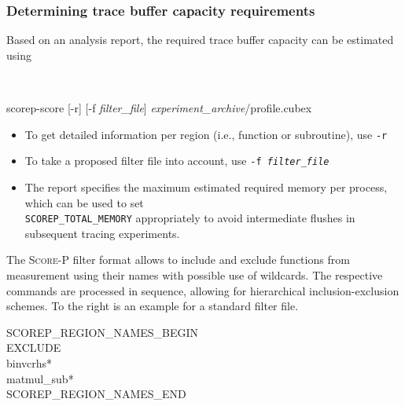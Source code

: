 \documentclass[a4paper]{article}
\newcommand{\Scorep}{\textsc{Score-P}\xspace}
\begin{document}
\subsubsection*{Determining trace buffer capacity requirements}
Based on an analysis report, the required trace buffer capacity can be
estimated using
\begin{flushright}
  \\
  \vspace*{-22mm}
\end{flushright}
\begin{center}
  \ttfamily
  scorep-score [-r] [-f \textit{\rmfamily filter\_file}]
               \textit{\rmfamily experiment\_archive}/profile.cubex
\end{center}
\begin{itemize}
  \item To get detailed information per region (i.e., function or subroutine), use
        \texttt{-r}
  \item To take a proposed filter file into account, use
        \texttt{-f \textit{\rmfamily filter\_file}}
  \item The report specifies the maximum estimated
        required memory per process, which can be used to set\\
        \texttt{SCOREP\_TOTAL\_MEMORY} appropriately to avoid intermediate flushes
        in subsequent tracing experiments.
\end{itemize}

\begin{minipage}[t]{0.5\textwidth}
The \Scorep filter format allows to include and exclude functions from measurement
using their names with possible use of wildcards.
The respective commands are processed in sequence, allowing for hierarchical inclusion-exclusion schemes.
To the right is an example for a standard filter file.
\end{minipage}
\begin{minipage}[t]{0.49\textwidth}
\ttfamily
 \hspace*{2ex} SCOREP\_REGION\_NAMES\_BEGIN \\
 \hspace*{5ex}   EXCLUDE \\
 \hspace*{9ex}     binvcrhs*  \\
 \hspace*{9ex}     matmul\_sub*  \\
 \hspace*{2ex} SCOREP\_REGION\_NAMES\_END
\end{minipage}
\end{document}
